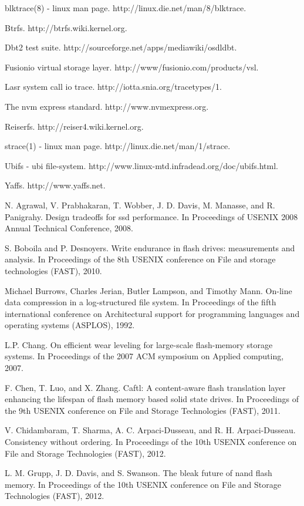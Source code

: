 \begin{translationbib}
\item blktrace(8) - linux man page. http://linux.die.net/man/8/blktrace.
\item Btrfs. http://btrfs.wiki.kernel.org.
\item Dbt2 test suite. http://sourceforge.net/apps/mediawiki/osdldbt.
\item Fusionio virtual storage layer. http://www/fusionio.com/products/vsl.
\item Lasr system call io trace. http://iotta.snia.org/tracetypes/1.
\item The nvm express standard. http://www.nvmexpress.org.
\item Reiserfs. http://reiser4.wiki.kernel.org.
\item strace(1) - linux man page. http://linux.die.net/man/1/strace.
\item Ubifs - ubi file-system. http://www.linux-mtd.infradead.org/doc/ubifs.html.
\item Yaffs. http://www.yaffs.net.
\item N. Agrawal, V. Prabhakaran, T. Wobber, J. D. Davis, M. Manasse, and R. Panigrahy. Design tradeoffs for ssd performance. In Proceedings of USENIX 2008 Annual Technical Conference, 2008.
\item S. Boboila and P. Desnoyers. Write endurance in flash drives: measurements and analysis. In Proceedings of the 8th USENIX conference on File and storage technologies (FAST), 2010.
\item Michael Burrows, Charles Jerian, Butler Lampson, and Timothy Mann. On-line data compression in a log-structured file system. In Proceedings of the fifth international conference on Architectural support for programming languages and operating systems (ASPLOS), 1992.
\item L.P. Chang. On efficient wear leveling for large-scale flash-memory storage systems. In Proceedings of the 2007 ACM symposium on Applied computing, 2007.
\item F. Chen, T. Luo, and X. Zhang. Caftl: A content-aware flash translation layer enhancing the lifespan of flash memory based solid state drives. In Proceedings of the 9th USENIX conference on File and Storage Technologies (FAST), 2011.
\item V. Chidambaram, T. Sharma, A. C. Arpaci-Dusseau, and R. H. Arpaci-Dusseau. Consistency without ordering. In Proceedings of the 10th USENIX conference on File and Storage Technologies (FAST), 2012.
\item L. M. Grupp, J. D. Davis, and S. Swanson. The bleak future of nand flash memory. In Proceedings of the 10th USENIX conference on File and Storage Technologies (FAST), 2012.

\end{translationbib}
